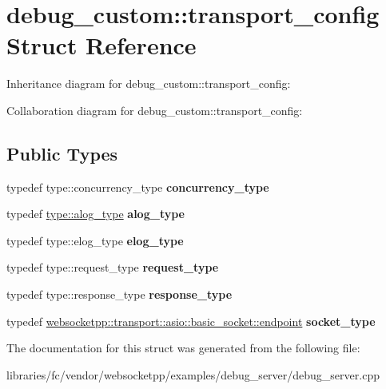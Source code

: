 \hypertarget{structdebug__custom_1_1transport__config}{}\section{debug\+\_\+custom\+:\+:transport\+\_\+config Struct Reference}
\label{structdebug__custom_1_1transport__config}


Inheritance diagram for debug\+\_\+custom\+:\+:transport\+\_\+config\+:


Collaboration diagram for debug\+\_\+custom\+:\+:transport\+\_\+config\+:
\subsection*{Public Types}
\begin{DoxyCompactItemize}
\item 
\mbox{\label{structdebug__custom_1_1transport__config_ad971252f0797121281a99e7ef967ca94}} 
typedef type\+::concurrency\+\_\+type {\bfseries concurrency\+\_\+type}
\item 
\mbox{\label{structdebug__custom_1_1transport__config_abb0764724581e00895e61dd0cead3dbd}} 
typedef \mbox{\hyperlink{structdebug__custom_a30b665e32e61e9ded636e08b937786c3}{type\+::alog\+\_\+type}} {\bfseries alog\+\_\+type}
\item 
\mbox{\label{structdebug__custom_1_1transport__config_a97bef77a8d5452331485f3b964230aec}} 
typedef type\+::elog\+\_\+type {\bfseries elog\+\_\+type}
\item 
\mbox{\label{structdebug__custom_1_1transport__config_af3bf13e3199147e00efd76baf99d5e82}} 
typedef type\+::request\+\_\+type {\bfseries request\+\_\+type}
\item 
\mbox{\label{structdebug__custom_1_1transport__config_ab9d4a0184fb6372f6e90b8f15fb38301}} 
typedef type\+::response\+\_\+type {\bfseries response\+\_\+type}
\item 
\mbox{\label{structdebug__custom_1_1transport__config_a3966c723f72f598f05abf959ed81e767}} 
typedef \mbox{\hyperlink{classwebsocketpp_1_1transport_1_1asio_1_1basic__socket_1_1endpoint}{websocketpp\+::transport\+::asio\+::basic\+\_\+socket\+::endpoint}} {\bfseries socket\+\_\+type}
\end{DoxyCompactItemize}


The documentation for this struct was generated from the following file\+:\begin{DoxyCompactItemize}
\item 
libraries/fc/vendor/websocketpp/examples/debug\+\_\+server/debug\+\_\+server.\+cpp\end{DoxyCompactItemize}
